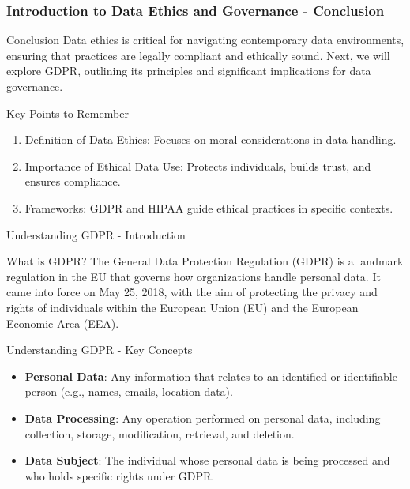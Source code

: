 \documentclass[aspectratio=169]{beamer}
\begin{document}
\begin{frame}[fragile]
    \frametitle{Introduction to Data Ethics and Governance - Conclusion}
    
    \begin{block}{Conclusion}
        Data ethics is critical for navigating contemporary data environments, ensuring that practices are legally compliant and ethically sound. 
        Next, we will explore GDPR, outlining its principles and significant implications for data governance.
    \end{block}
    
    \begin{block}{Key Points to Remember}
        \begin{enumerate}
            \item Definition of Data Ethics: Focuses on moral considerations in data handling.
            \item Importance of Ethical Data Use: Protects individuals, builds trust, and ensures compliance.
            \item Frameworks: GDPR and HIPAA guide ethical practices in specific contexts.
        \end{enumerate}
    \end{block}
\end{frame}

\begin{frame}[fragile]{Understanding GDPR - Introduction}
    \begin{block}{What is GDPR?}
        The General Data Protection Regulation (GDPR) is a landmark regulation in the EU that governs how organizations handle personal data. It came into force on May 25, 2018, with the aim of protecting the privacy and rights of individuals within the European Union (EU) and the European Economic Area (EEA).
    \end{block}
\end{frame}

\begin{frame}[fragile]{Understanding GDPR - Key Concepts}
    \begin{itemize}
        \item \textbf{Personal Data}: Any information that relates to an identified or identifiable person (e.g., names, emails, location data).
        \item \textbf{Data Processing}: Any operation performed on personal data, including collection, storage, modification, retrieval, and deletion.
        \item \textbf{Data Subject}: The individual whose personal data is being processed and who holds specific rights under GDPR.
    \end{itemize}
\end{frame}
\end{document}

